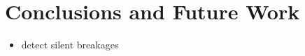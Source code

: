 \section{Conclusions and Future Work}\label{sec:conclusions}

\begin{itemize}
\item detect silent breakages
\end{itemize}

